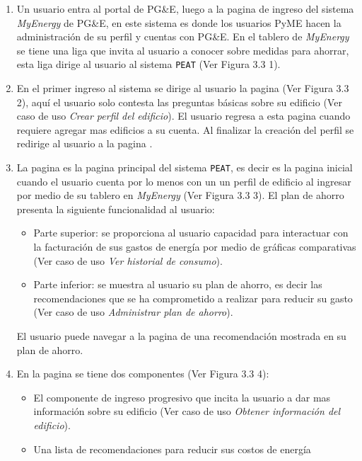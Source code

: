 \begin{enumerate}
\item Un usuario entra al portal de PG\&E, luego a la pagina de ingreso del
  sistema \textit{MyEnergy} de PG\&E, en este sistema es donde los usuarios PyME
  hacen la administración de su perfil y cuentas con PG\&E. En el tablero de
  \textit{MyEnergy} se tiene una liga que invita al usuario a conocer sobre
  medidas para ahorrar, esta liga dirige al usuario al sistema \texttt{PEAT}
  (Ver Figura 3.3 1).
\item En el primer ingreso al sistema se dirige al usuario la pagina
   (Ver Figura 3.3 2), aquí el usuario
  solo contesta las preguntas básicas sobre su edificio
  (Ver caso de uso \textit{Crear perfil del edificio}).
  El usuario regresa a esta pagina cuando requiere agregar mas edificios a su cuenta.
  Al finalizar la creación del perfil se redirige al usuario a la pagina
  .
\item La pagina  es la pagina principal del sistema
  \texttt{PEAT}, es decir es la pagina inicial cuando el usuario cuenta por lo
  menos con un un perfil de edificio al ingresar por medio de su tablero en
  \textit{MyEnergy} (Ver Figura 3.3 3).
  El plan de ahorro presenta la siguiente funcionalidad al usuario:
  \begin{itemize}
  \item Parte superior: se proporciona al usuario capacidad para interactuar
    con la facturación de sus gastos de energía por medio de gráficas comparativas
    (Ver caso de uso \textit{Ver historial de consumo}).
  \item Parte inferior: se muestra al usuario su plan de ahorro, es decir
    las recomendaciones que se ha comprometido a realizar para reducir su gasto
    (Ver caso de uso \textit{Administrar plan de ahorro}).
  \end{itemize}
  El usuario puede navegar a la pagina 
  de una recomendación mostrada en su plan de ahorro.
\item En la pagina  se tiene dos componentes
  (Ver Figura 3.3 4):
  \begin{itemize}
  \item El componente de ingreso progresivo que incita la usuario a
    dar mas información sobre su edificio (Ver caso de uso \textit{Obtener
      información del edificio}).
  \item Una lista de recomendaciones para reducir sus costos de energía

\end{itemize}
\end{enumerate}
